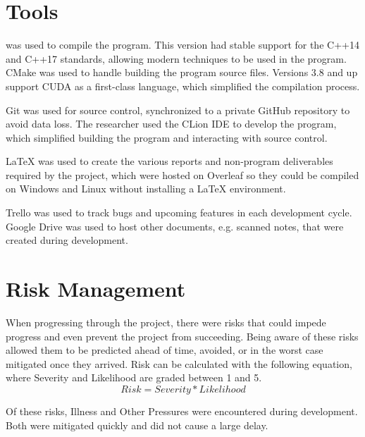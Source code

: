 \section{Tools}
\label{sec:ProjManagementTools}
 was used to compile the program.
This version had stable support for the C++14 and C++17 standards, allowing modern techniques to be used in the program.
CMake was used to handle building the program source files.
Versions 3.8 and up support CUDA as a first-class language, which simplified the compilation process.

Git was used for source control, synchronized to a private GitHub repository to avoid data loss.
The researcher used the CLion IDE to develop the program, which simplified building the program and interacting with source control.

\LaTeX{} was used to create the various reports and non-program deliverables required by the project, which were hosted on Overleaf so they could be compiled on Windows and Linux without installing a \LaTeX{} environment.

Trello was used to track bugs and upcoming features in each development cycle.
Google Drive was used to host other documents, e.g. scanned notes, that were created during development.

\section{Risk Management}
When progressing through the project, there were risks that could impede progress and even prevent the project from succeeding.
Being aware of these risks allowed them to be predicted ahead of time, avoided, or in the worst case mitigated once they arrived.
Risk can be calculated with the following equation, where Severity and Likelihood are graded between 1 and 5.
\begin{equation*}
    Risk = Severity * Likelihood
\end{equation*}

Of these risks, Illness and Other Pressures were encountered during development.
Both were mitigated quickly and did not cause a large delay.

